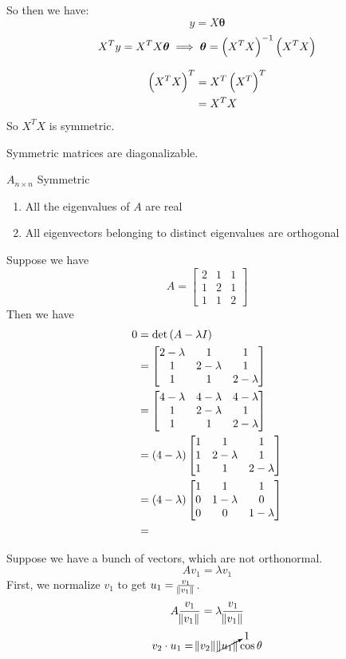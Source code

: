 \documentclass{article}
\newcommand{\m}[1]{\begin{bmatrix} #1 \end{bmatrix}}
\newcommand{\sm}[1]{\left[\begin{smallmatrix} #1 \end{smallmatrix}\right]}
\begin{document}
So then we have:
\[y = X\bm \theta\]
\[X^Ty = X^TX\bm \theta\implies \bm \theta = \del{X^TX}^{-1}\del{X^TX}\]
\begin{aside}
  \begin{align*}
    \del{X^TX}^T &= X^T\del{X^T}^T\\
    &= X^TX
  \end{align*}
  So \(X^TX\) is symmetric.
\end{aside}

Symmetric matrices are diagonalizable.


\begin{aside}[Recall]
  \(A_{n\times n}\) Symmetric
  \begin{enumerate}
  \item All the eigenvalues of \(A\) are real
  \item All eigenvectors belonging to distinct eigenvalues are orthogonal
  \end{enumerate}
\end{aside}

Suppose we have
\[A = \sm{2 & 1 & 1\\ 1 & 2 & 1\\ 1 & 1 & 2}\]
Then we have
\begin{align*}
  0 &= \det\del{A - \lambda I}\\
    &=\m{2 -\lambda& 1 & 1\\ 1 & 2 -\lambda& 1\\ 1 & 1 & 2-\lambda}\\
  &= \m{4 -\lambda& 4-\lambda & 4-\lambda\\ 1 & 2 -\lambda& 1\\ 1 & 1 & 2-\lambda}\\
    &= (4-\lambda)\m{1 & 1 & 1\\ 1 & 2 -\lambda& 1\\ 1 & 1 & 2-\lambda}\\
  &= (4-\lambda)\m{1 & 1 & 1\\ 0 & 1 -\lambda& 0\\ 0 & 0 & 1-\lambda}\\
                                                           &=
\end{align*}

Suppose we have a bunch of vectors, which are not orthonormal.
\[Av_1 = \lambda v_1\]
First, we normalize \(v_1\) to get \(u_1 = \frac{v_1}{\norm{v_1}}\).
\[A\frac{v_1}{\norm{v_1}} = \lambda \frac{v_1}{\norm{v_1}}\]
\[v_2 \cdot u_1 = \norm{v_2} \cancelto{1}{\norm{u_1}} \cos \theta\]
\end{document}
